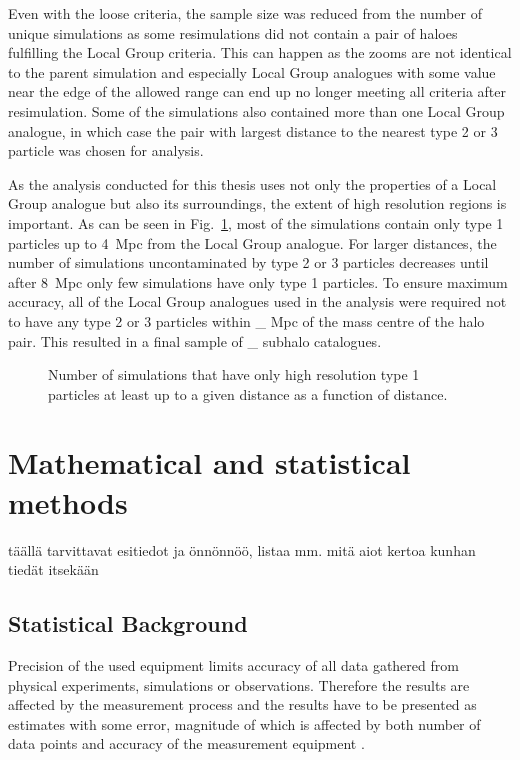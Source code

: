 \documentclass[english, oneside]{HYgradu}
\begin{document}
Even with the loose criteria, the sample size was reduced from the number of unique simulations as some resimulations did not contain a pair of haloes fulfilling the Local Group criteria. This can happen as the zooms are not identical to the parent simulation and especially Local Group analogues with some value near the edge of the allowed range can end up no longer meeting all criteria after resimulation. Some of the simulations also contained more than one Local Group analogue, in which case the pair with largest distance to the nearest type 2 or 3 particle was chosen for analysis.

As the analysis conducted for this thesis uses not only the properties of a Local Group analogue but also its surroundings, the extent of high resolution regions is important. As can be seen in Fig.\ \ref{fig:uncontaminatedDistances}, most of the simulations contain only type 1 particles up to 4~Mpc from the Local Group analogue. For larger distances, the number of simulations uncontaminated by type 2 or 3 particles decreases until after 8~Mpc only few simulations have only type 1 particles.
To ensure maximum accuracy, all of the Local Group analogues used in the analysis were required not to have any type 2 or 3 particles within \_ Mpc of the mass centre of the halo pair. %
This resulted in a final sample of \_ subhalo catalogues. %


\begin{figure}
    \centering
    
    \caption{Number of simulations that have only high resolution type 1 particles at least up to a given distance as a function of distance.}\label{fig:uncontaminatedDistances}
\end{figure}

\chapter{Mathematical and statistical methods}
täällä tarvittavat esitiedot ja önnönnöö, listaa mm. mitä aiot kertoa kunhan tiedät itsekään

\section{Statistical Background}
Precision of the used equipment limits accuracy of all data gathered from physical experiments, simulations or observations. Therefore the results are affected by the measurement process and the results have to be presented as estimates with some error, magnitude of which is affected by both number of data points and accuracy of the measurement equipment \citep{bohm2010introduction}.
\end{document}
